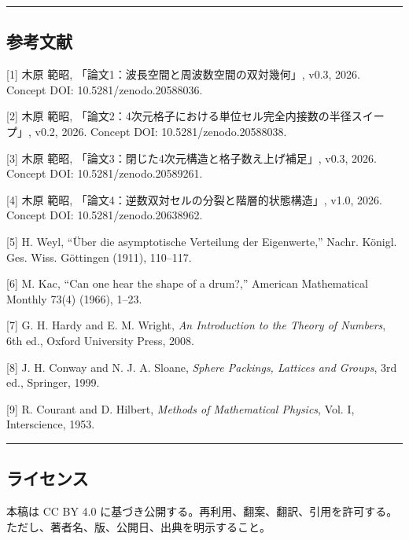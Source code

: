 \documentclass[
]{ltjsarticle}
\begin{document}
\begin{center}\rule{0.5\linewidth}{0.5pt}\end{center}

\subsection{参考文献}\label{ux53c2ux8003ux6587ux732e}

{[}1{]} 木原 範昭, 「論文1：波長空間と周波数空間の双対幾何」, v0.3,
2026. Concept DOI: 10.5281/zenodo.20588036.

{[}2{]} 木原 範昭,
「論文2：4次元格子における単位セル完全内接数の半径スイープ」, v0.2,
2026. Concept DOI: 10.5281/zenodo.20588038.

{[}3{]} 木原 範昭, 「論文3：閉じた4次元構造と格子数え上げ補足」, v0.3,
2026. Concept DOI: 10.5281/zenodo.20589261.

{[}4{]} 木原 範昭, 「論文4：逆数双対セルの分裂と階層的状態構造」, v1.0,
2026. Concept DOI: 10.5281/zenodo.20638962.

{[}5{]} H. Weyl, ``Über die asymptotische Verteilung der Eigenwerte,''
Nachr. Königl. Ges. Wiss. Göttingen (1911), 110--117.

{[}6{]} M. Kac, ``Can one hear the shape of a drum?,'' American
Mathematical Monthly 73(4) (1966), 1--23.

{[}7{]} G. H. Hardy and E. M. Wright, \emph{An Introduction to the
Theory of Numbers}, 6th ed., Oxford University Press, 2008.

{[}8{]} J. H. Conway and N. J. A. Sloane, \emph{Sphere Packings,
Lattices and Groups}, 3rd ed., Springer, 1999.

{[}9{]} R. Courant and D. Hilbert, \emph{Methods of Mathematical
Physics}, Vol. I, Interscience, 1953.

\begin{center}\rule{0.5\linewidth}{0.5pt}\end{center}

\subsection{ライセンス}\label{ux30e9ux30a4ux30bbux30f3ux30b9}

本稿は CC BY 4.0
に基づき公開する。再利用、翻案、翻訳、引用を許可する。ただし、著者名、版、公開日、出典を明示すること。
\end{document}
